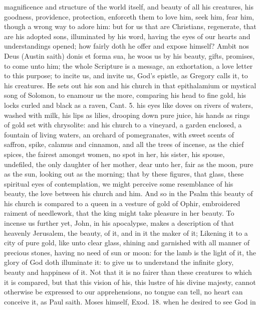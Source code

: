 {magnificence and structure of the world itself, and beauty of all his
creatures, his goodness, providence, protection, enforceth them to love
him, seek him, fear him, though a wrong way to adore him: but for us
that are Christians, regenerate, that are his adopted sons, illuminated
by his word, having the eyes of our hearts and understandings opened;
how fairly doth he offer and expose himself? Ambit nos Deus (Austin
saith) donis et forma sua, he woos us by his beauty, gifts, promises,
to come unto him; the whole Scripture is a message, an
exhortation, a love letter to this purpose; to incite us, and invite
us, God's epistle, as Gregory calls it, to his creatures. He sets
out his son and his church in that epithalamium or mystical song of
Solomon, to enamour us the more, comparing his head to fine gold, his
locks curled and black as a raven, Cant.  5. his eyes like doves on
rivers of waters, washed with milk, his lips as lilies, drooping down
pure juice, his hands as rings of gold set with chrysolite: and his
church to a vineyard, a garden enclosed, a fountain of living waters,
an orchard of pomegranates, with sweet scents of saffron, spike,
calamus and cinnamon, and all the trees of incense, as the chief
spices, the fairest amongst women, no spot in her, his sister,
his spouse, undefiled, the only daughter of her mother, dear unto her,
fair as the moon, pure as the sun, looking out as the morning; that by
these figures, that glass, these spiritual eyes of contemplation, we
might perceive some resemblance of his beauty, the love between his
church and him. And so in the  Psalm this beauty of his church is
compared to a queen in a vesture of gold of Ophir, embroidered raiment
of needlework, that the king might take pleasure in her beauty. To
incense us further yet, John, in his apocalypse, makes a
description of that heavenly Jerusalem, the beauty, of it, and in it
the maker of it; Likening it to a city of pure gold, like unto clear
glass, shining and garnished with all manner of precious stones, having
no need of sun or moon: for the lamb is the light of it, the glory of
God doth illuminate it: to give us to understand the infinite glory,
beauty and happiness of it. Not that it is no fairer than these
creatures to which it is compared, but that this vision of his, this
lustre of his divine majesty, cannot otherwise be expressed to our
apprehensions, no tongue can tell, no heart can conceive it, as Paul
saith. Moses himself, Exod.  18. when he desired to see God in
}
